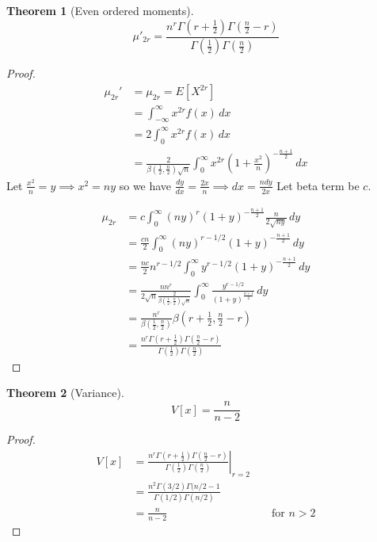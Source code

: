 \documentclass[oneside,11pt,pdftex]{book}%
\numberwithin{equation}{section}
\newtheorem{theorem}{Theorem}[chapter]%
\numberwithin{section}{chapter}
\numberwithin{equation}{chapter}
\begin{document}
\begin{theorem}[Even ordered moments]
	\[ \mu'_{2r}=\frac{n^r \Gamma \left(r+\frac{1}{2}\right)\Gamma\left(\frac{n}{2}-r\right)}{\Gamma\left(\frac{1}{2}\right)\Gamma\left(\frac{n}{2}\right)} \]
\end{theorem}
\begin{proof}
	\begin{align*}
		\mu_{2r}'&=\mu_{2r}=E[X^{2r}]\\
		&=\int_{-\infty}^\infty x^{2r}f(x)\, dx\\
		&= 2\int_0^{\infty} x^{2r}f(x)\, dx\\
		&= \frac{2}{\beta\left(\frac{1}{2}, \frac{n}{2}\right)\sqrt{n}}\int_0^\infty x^{2r}\left(1+\frac{x^2}{n}\right)^{- \frac{n+1}{2}}\, dx
	\end{align*}
Let $ \frac{x^2}{n} =y \implies x^2=ny$ so we have $ \frac{dy}{dx}=\frac{2x}{n} \implies dx=\frac{n dy}{2x} $ Let beta term be $ c $.

\begin{align*}
	\mu_{2r}&=c\int_0^\infty (ny)^r (1+y)^{-\frac{n+1}{2}} \frac{n}{2\sqrt{ny}}\, dy\\
	&= \frac{cn}{2} \int_0^\infty (ny)^{r-1/2}(1+y)^{-\frac{n+1}{2}}\, dy\\
	&= \frac{nc}{2} n^{r-1/2} \int_0^\infty y^{r-1/2}(1+y)^{-\frac{n+1}{2}}\, dy\\
	&=\frac{nn^r}{2\sqrt{n}\frac{2}{\beta \left(\frac{1}{2}, \frac{n}{2}\right)\sqrt{n}}}\int_0^\infty \frac{y^{r-1/2}}{(1+y)^{\frac{n+1}{2}}} \, dy\\
	&= \frac{n^r}{\beta \left(\frac{1}{2}, \frac{n}{2}\right)} \beta\left(r+\frac{1}{2}, \frac{n}{2}-r\right)\\
	&=\frac{n^r \Gamma \left(r+\frac{1}{2}\right)\Gamma\left(\frac{n}{2}-r\right)}{\Gamma\left(\frac{1}{2}\right)\Gamma\left(\frac{n}{2}\right)}
\end{align*}
\end{proof}

\begin{theorem}[Variance]
	\[ V[x]= \frac{n}{n-2}\]
\end{theorem}
\begin{proof}
	\begin{align*}
		V[x]&=\left. \frac{n^r \Gamma \left(r+\frac{1}{2}\right)\Gamma\left(\frac{n}{2}-r\right)}{\Gamma\left(\frac{1}{2}\right)\Gamma\left(\frac{n}{2}\right)} \right|_{r=2}\\
		&=\frac{n^2 \Gamma(3/2)\Gamma(n/2-1}{\Gamma(1/2)\Gamma(n/2)}\\
		&=\frac{n}{n-2} && \text{ for $n>2$}
	\end{align*}
\end{proof}
\end{document}
